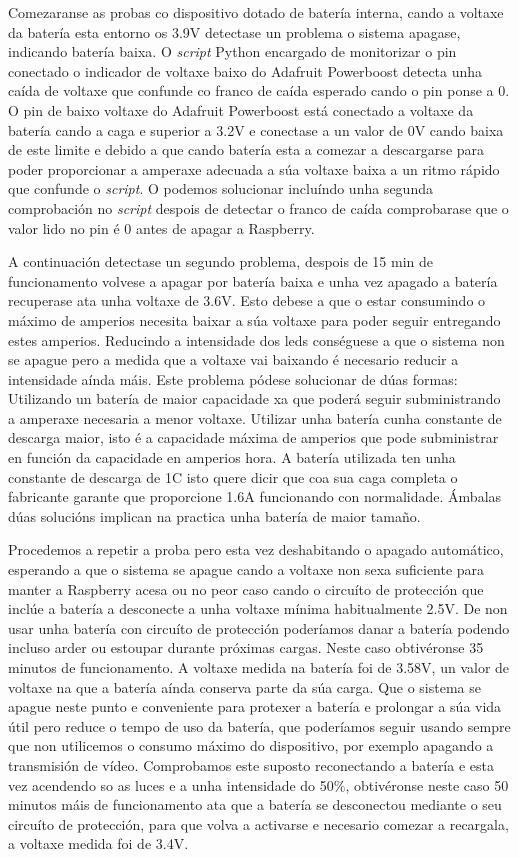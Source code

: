 Comezaranse as probas co dispositivo dotado de batería interna, cando a voltaxe da batería esta entorno os 3.9V detectase un problema o sistema apagase, indicando batería baixa. O \emph{script} Python encargado de monitorizar o pin conectado o indicador de voltaxe baixo do Adafruit Powerboost detecta unha caída de voltaxe que confunde co franco de caída esperado cando o pin ponse a 0. O pin de baixo voltaxe do Adafruit Powerboost está conectado a voltaxe da batería cando a caga e superior a 3.2V e conectase a un valor de 0V cando baixa de este limite e debido a que cando batería esta a comezar a descargarse para poder proporcionar a amperaxe adecuada a súa voltaxe baixa a un ritmo rápido que confunde o \emph{script}. O podemos solucionar incluíndo unha segunda comprobación no \emph{script} despois de detectar o franco de caída comprobarase que o valor lido no pin é 0 antes de apagar a Raspberry.

A continuación detectase un segundo problema, despois de 15 min de funcionamento volvese a apagar por batería baixa e unha vez apagado a batería recuperase ata unha voltaxe de 3.6V. Esto debese a que o estar consumindo o máximo de amperios necesita baixar a súa voltaxe para poder seguir entregando estes amperios. Reducindo a intensidade dos leds conséguese a que o sistema non se apague pero a medida que a voltaxe vai baixando é necesario reducir a intensidade aínda máis.  Este problema pódese solucionar de dúas formas:
Utilizando un batería de maior capacidade xa que poderá seguir subministrando a amperaxe necesaria a menor voltaxe.
Utilizar unha batería cunha constante de descarga maior, isto é a capacidade máxima de amperios que pode subministrar en función da capacidade en amperios hora. A batería utilizada ten unha constante de descarga de 1C isto quere dicir que coa sua caga completa o fabricante garante que proporcione 1.6A funcionando con normalidade.
Ámbalas dúas solucións implican na practica unha batería de maior tamaño.

Procedemos a repetir a proba pero esta vez deshabitando o apagado automático, esperando a que o sistema se apague cando a voltaxe non sexa suficiente para manter a Raspberry acesa ou no peor caso cando o circuíto de protección que inclúe a batería a desconecte a unha voltaxe mínima habitualmente 2.5V. De non usar unha batería con circuíto de protección poderíamos danar a batería podendo incluso arder ou estoupar durante próximas cargas. Neste caso obtivéronse 35 minutos de funcionamento. A voltaxe medida na batería foi de 3.58V, un valor de voltaxe na que a batería aínda conserva parte da súa carga. Que o sistema se apague neste punto e conveniente para protexer a batería e prolongar a súa vida útil pero reduce o tempo de uso da batería, que poderíamos seguir usando sempre que non utilicemos o consumo máximo do dispositivo, por exemplo apagando a transmisión de vídeo. Comprobamos este suposto reconectando a batería e esta vez acendendo so as luces e a unha intensidade do 50\(\%\), obtivéronse neste caso 50 minutos máis de funcionamento ata que a batería se desconectou mediante o seu circuíto de protección, para que volva a activarse e necesario comezar a recargala, a voltaxe medida foi de 3.4V.


